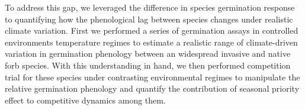 \documentclass{article}\usepackage[]{graphicx}\usepackage[]{color}
\begin{document}
To address this gap, we leveraged the difference in species germination response to quantifying how the phenological lag between species changes under realistic climate variation. First we performed a series of germination assays in controlled environments temperature regimes to estimate a realistic range of climate-driven variation in germination phenology between an widespread invasive and native forb species. With this understanding in hand, we then performed competition trial for these species under contrasting environmental regimes to manipulate the relative germination phenology and quantify the contribution of seasonal priority effect to competitive dynamics among them.
\end{document}

